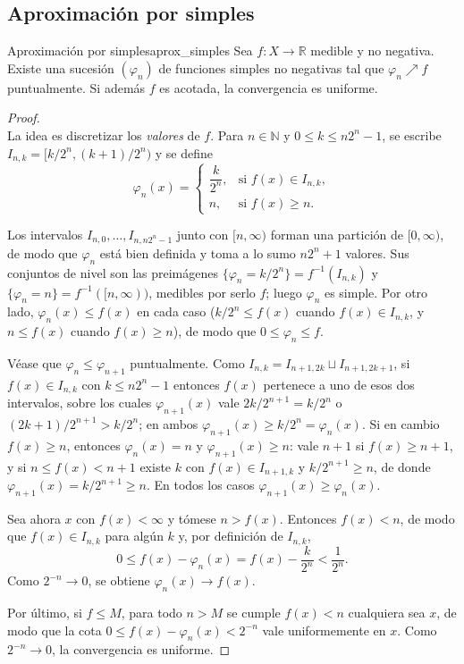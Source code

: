 \documentclass[11pt, a4paper]{article}
\begin{document}
\subsection{Aproximación por simples}

\begin{teorema}{Aproximación por simples}{aprox_simples}
Sea $f: X \to \mathbb{R}$ medible y no negativa. Existe una sucesión $(\varphi_n)$ de funciones
simples no negativas tal que $\varphi_n \nearrow f$ puntualmente. Si además $f$ es acotada, la
convergencia es uniforme.
\end{teorema}

\begin{proof}\leavevmode\\
La idea es discretizar los \emph{valores} de $f$. Para $n \in \mathbb{N}$ y $0 \le k \le n 2^n - 1$,
se escribe $I_{n,k} = [k/2^n, (k+1)/2^n)$ y se define
$$ \varphi_n(x) = \begin{cases}
\dfrac{k}{2^n}, & \text{si } f(x) \in I_{n,k}, \\
n, & \text{si } f(x) \ge n.
\end{cases} $$

Los intervalos $I_{n,0}, \dots, I_{n, n2^n - 1}$ junto con $[n, \infty)$ forman una partición de
$[0, \infty)$, de modo que $\varphi_n$ está bien definida y toma a lo sumo $n 2^n + 1$ valores.
Sus conjuntos de nivel son las preimágenes $\{\varphi_n = k/2^n\} = f^{-1}(I_{n,k})$ y
$\{\varphi_n = n\} = f^{-1}([n, \infty))$, medibles por serlo $f$; luego $\varphi_n$ es simple. Por
otro lado, $\varphi_n(x) \le f(x)$ en cada caso ($k/2^n \le f(x)$ cuando $f(x) \in I_{n,k}$, y
$n \le f(x)$ cuando $f(x) \ge n$), de modo que $0 \le \varphi_n \le f$.

Véase que $\varphi_n \le \varphi_{n+1}$ puntualmente. Como $I_{n,k} = I_{n+1, 2k} \sqcup
I_{n+1, 2k+1}$, si $f(x) \in I_{n,k}$ con $k \le n 2^n - 1$ entonces $f(x)$ pertenece a uno de esos
dos intervalos, sobre los cuales $\varphi_{n+1}(x)$ vale $2k/2^{n+1} = k/2^n$ o
$(2k+1)/2^{n+1} > k/2^n$; en ambos $\varphi_{n+1}(x) \ge k/2^n = \varphi_n(x)$. Si en cambio
$f(x) \ge n$, entonces $\varphi_n(x) = n$ y $\varphi_{n+1}(x) \ge n$: vale $n+1$ si $f(x) \ge n+1$,
y si $n \le f(x) < n+1$ existe $k$ con $f(x) \in I_{n+1,k}$ y $k/2^{n+1} \ge n$, de donde
$\varphi_{n+1}(x) = k/2^{n+1} \ge n$. En todos los casos $\varphi_{n+1}(x) \ge \varphi_n(x)$.

Sea ahora $x$ con $f(x) < \infty$ y tómese $n > f(x)$. Entonces $f(x) < n$, de modo que
$f(x) \in I_{n,k}$ para algún $k$ y, por definición de $I_{n,k}$,
$$ 0 \le f(x) - \varphi_n(x) = f(x) - \frac{k}{2^n} < \frac{1}{2^n}. $$
Como $2^{-n} \to 0$, se obtiene $\varphi_n(x) \to f(x)$.

Por último, si $f \le M$, para todo $n > M$ se cumple $f(x) < n$ cualquiera sea $x$, de modo que la
cota $0 \le f(x) - \varphi_n(x) < 2^{-n}$ vale uniformemente en $x$. Como $2^{-n} \to 0$, la
convergencia es uniforme.
\end{proof}
\end{document}
